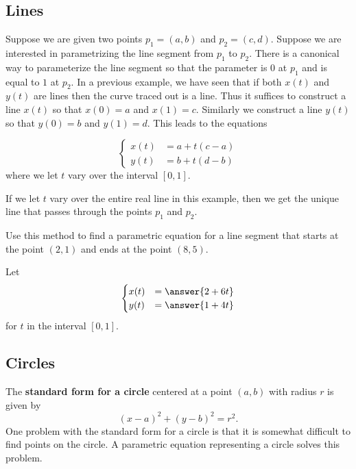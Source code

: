 \documentclass{ximera}
\begin{document}
\subsection{Lines}

Suppose we are given two points $p_{1}=(a,b)$ and $p_{2}=(c, d)$. Suppose we are interested in parametrizing the line segment from $p_{1}$ to $p_{2}$. There is a canonical way to parameterize the line segment so that the parameter is $0$ at $p_{1}$ and is equal to $1$ at $p_{2}$. In a previous example, we have seen that if both $x(t)$ and $y(t)$ are lines then the curve traced out is a line. Thus it suffices to construct a line $x(t)$ so that $x(0)=a$ and $x(1)=c$. Similarly we construct a line $y(t)$ so that $y(0)=b$ and $y(1)=d$. This
 leads to the equations


\[
\begin{cases}
x(t)&=a+t(c-a) \\
y(t)&=b+t(d-b)
\end{cases}
\]
where we let $t$ vary over the interval $[0,1]$.

If we let $t$ vary over the entire real line in this example, then we get the unique line that passes through the points $p_{1}$ and $p_{2}$.

\begin{question}
Use this method to find a parametric equation for a line segment that starts at the point $(2,1)$ and ends at the point $(8, 5)$.

Let
\[
\begin{cases}
x(t)&=\answer{2+6t}\\
y(t)&=\answer{1+4t}
\end{cases}
\]
for $t$ in the interval $[0, 1]$.


\end{question}




\subsection{Circles}

The \textbf{standard form for a circle} centered at a point $(a,b)$ with
radius $r$ is given by
\[
(x-a)^2 + (y-b)^2 = r^2.
\]
One problem with the standard form for a circle is that it is somewhat
difficult to find points on the circle. A parametric equation
representing a circle solves this problem.
\end{document}
